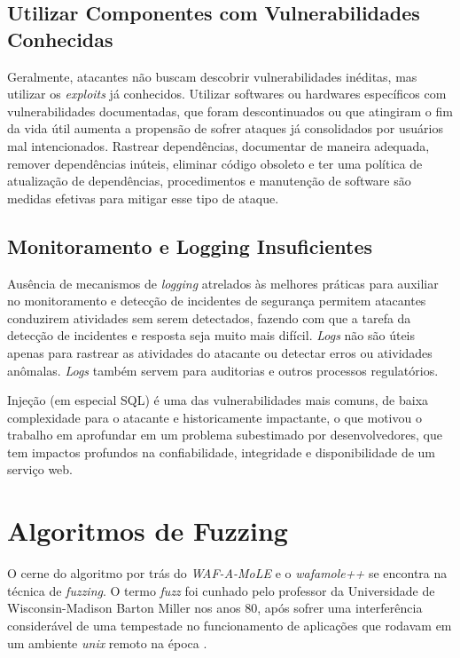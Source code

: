 \subsection{Utilizar Componentes com Vulnerabilidades Conhecidas}
Geralmente, atacantes não buscam descobrir vulnerabilidades inéditas, mas utilizar os \textit{exploits} já conhecidos.
Utilizar softwares ou hardwares específicos com vulnerabilidades documentadas, que foram descontinuados ou que atingiram o fim da vida útil aumenta a propensão de sofrer ataques já consolidados por usuários mal intencionados.
Rastrear dependências, documentar de maneira adequada, remover dependências inúteis, eliminar código obsoleto e ter uma política de atualização de dependências, procedimentos e manutenção de software são medidas efetivas para mitigar esse tipo de ataque.

\subsection{Monitoramento e Logging Insuficientes}
Ausência de mecanismos de \textit{logging} atrelados às melhores práticas para auxiliar no monitoramento e detecção de incidentes de segurança permitem atacantes conduzirem atividades sem serem detectados, fazendo com que a tarefa da detecção de incidentes e resposta seja muito mais difícil. \textit{Logs} não são úteis apenas para rastrear as atividades do atacante ou detectar erros ou atividades anômalas. \textit{Logs} também servem para auditorias e outros processos regulatórios.

Injeção (em especial SQL) é uma das vulnerabilidades mais comuns, de baixa complexidade para o atacante e historicamente impactante, o que motivou o trabalho em aprofundar em um problema subestimado por desenvolvedores, que tem impactos profundos na confiabilidade, integridade e disponibilidade de um serviço web.

\section{Algoritmos de Fuzzing}

O cerne do algoritmo por trás do \textit{WAF-A-MoLE} e o \textit{wafamole++} se encontra na técnica de \textit{fuzzing}. O termo \textit{fuzz} foi cunhado pelo professor da Universidade de Wisconsin-Madison Barton Miller nos anos 80, após sofrer uma interferência considerável de uma tempestade no funcionamento de aplicações que rodavam em um ambiente \textit{unix} remoto na época \cite{fuzzing_info}. 

